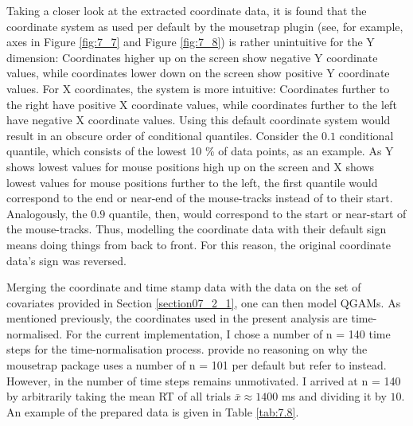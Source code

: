 Taking a closer look at the extracted coordinate data, it is found that the coordinate system as used per default by the mousetrap plugin (see, for example, axes in Figure \ref{fig:7_7} and Figure \ref{fig:7_8}) is rather unintuitive for the Y dimension: Coordinates higher up on the screen show negative Y coordinate values, while coordinates lower down on the screen show positive Y coordinate values. For X coordinates, the system is more intuitive: Coordinates further to the right have positive X coordinate values, while coordinates further to the left have negative X coordinate values. Using this default coordinate system would result in an obscure order of conditional quantiles. Consider the $0.1$ conditional quantile, which consists of the lowest 10 \% of data points, as an example. As Y shows lowest values for mouse positions high up on the screen and X shows lowest values for mouse positions further to the left, the first quantile would correspond to the end or near-end of the mouse-tracks instead of to their start. Analogously, the $0.9$ quantile, then, would correspond to the start or near-start of the mouse-tracks. Thus, modelling the coordinate data with their default sign means doing things from back to front. For this reason, the original coordinate data’s sign was reversed.

Merging the coordinate and time stamp data with the data on the set of covariates provided in Section \ref{section07_2_1}, one can then model QGAMs. As mentioned previously, the coordinates used in the present analysis are time-normalised. For the current implementation, I chose a number of n = 140 time steps for the time-normalisation process. \citet{Kieslich2019} provide no reasoning on why the mousetrap package uses a number of n = 101 per default but refer to \citet{Spivey2005} instead. However, in \citet{Spivey2005} the number of time steps remains unmotivated. I arrived at n = 140 by arbitrarily taking the mean RT of all trials $\bar{x}\approx 1400$ ms and dividing it by $10$. An example of the prepared data is given in Table \ref{tab:7.8}.

